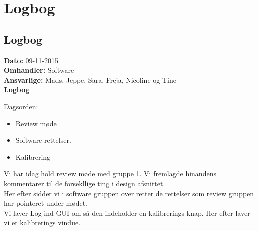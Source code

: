\chapter{Logbog}
\section{Logbog}

\textbf{Dato:} 09-11-2015 \\
\textbf{Omhandler:} Software \\
\textbf{Ansvarlige:} Mads, Jeppe, Sara, Freja, Nicoline og Tine \\
\textbf{Logbog}

Dagsorden:
\begin{itemize}
	\item Review møde
	\item Software rettelser.
	\item Kalibrering
\end{itemize}

Vi har idag hold review møde med gruppe 1. Vi fremlagde hinandens kommentarer til de forsekllige ting i design afsnittet.\\
Her efter sidder vi i software gruppen over retter de rettelser som review gruppen har pointeret under mødet.\\
Vi laver Log ind GUI om så den indeholder en kalibrerings knap. Her efter laver vi et kalibrerings vindue. 
   
